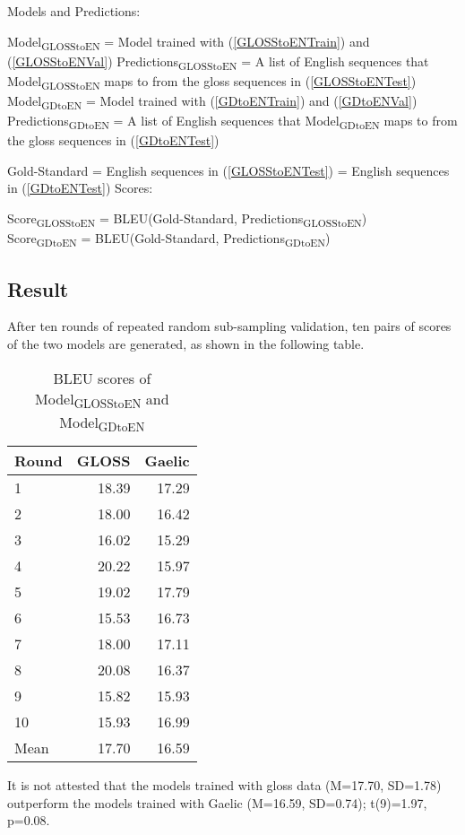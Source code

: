 \documentclass[a4paper]{article}
\begin{document}
\begin{exe}
\ex Models and Predictions: 
	\begin{xlist}
	\ex Model\textsubscript{GLOSStoEN} = Model trained with (\ref{GLOSStoENTrain}) and (\ref{GLOSStoENVal})
	\ex Predictions\textsubscript{GLOSStoEN} = A list of English sequences that Model\textsubscript{GLOSStoEN} maps to from the gloss sequences in (\ref{GLOSStoENTest}) 
	\ex Model\textsubscript{GDtoEN} = Model trained with (\ref{GDtoENTrain}) and (\ref{GDtoENVal}) 
	\ex Predictions\textsubscript{GDtoEN} = A list of English sequences that Model\textsubscript{GDtoEN} maps to from the gloss sequences in (\ref{GDtoENTest}) 
	\end{xlist}	
\ex Gold-Standard = English sequences in (\ref{GLOSStoENTest}) = English sequences in (\ref{GDtoENTest})
\ex Scores: \\
  \begin{xlist}
	\ex Score\textsubscript{GLOSStoEN} = BLEU(Gold-Standard, Predictions\textsubscript{GLOSStoEN}) \\
	\ex Score\textsubscript{GDtoEN} = BLEU(Gold-Standard, Predictions\textsubscript{GDtoEN}) \\
  \end{xlist}
\end{exe}


\subsection{Result} \label{gdglen_results}
After ten rounds of repeated random sub-sampling validation, ten pairs of scores of the two models are generated, as shown in the following table. 


\begin{table}[ht]
\centering
\begin{tabular}{lrr}
  \hline
Round & GLOSS & Gaelic \\ 
  \hline
1 & 18.39 & 17.29 \\ 
  2 & 18.00 & 16.42 \\ 
  3 & 16.02 & 15.29 \\ 
  4 & 20.22 & 15.97 \\ 
  5 & 19.02 & 17.79 \\ 
  6 & 15.53 & 16.73 \\ 
  7 & 18.00 & 17.11 \\ 
  8 & 20.08 & 16.37 \\ 
  9 & 15.82 & 15.93 \\ 
  10 & 15.93 & 16.99 \\ 
   \hline
Mean & 17.70 & 16.59 \\ 
   \hline
\end{tabular}
\caption{BLEU scores of Model\textsubscript{GLOSStoEN} and Model\textsubscript{GDtoEN}} 
\label{Table:BLEUGlossGD}
\end{table}
It is not attested that the models trained with gloss data (M=17.70, SD=1.78) outperform the models trained with Gaelic (M=16.59, SD=0.74); t(9)=1.97, p=0.08.
\end{document}
